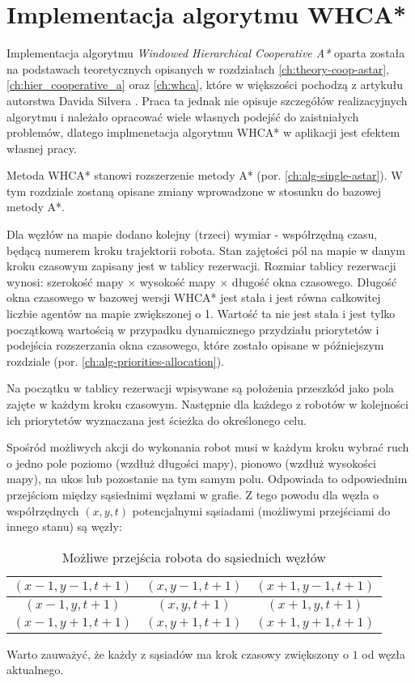 \section{Implementacja algorytmu WHCA*}
\label{ch:alg-whca}

Implementacja algorytmu {\it  Windowed Hierarchical Cooperative A*} oparta została na podstawach teoretycznych opisanych w rozdziałach \ref{ch:theory-coop-astar}, \ref{ch:hier_cooperative_a} oraz \ref{ch:whca}, które w większości pochodzą z artykułu autorstwa Davida Silvera \cite{cooppath}.
Praca ta jednak nie opisuje szczegółów realizacyjnych algorytmu i należało opracować wiele własnych podejść do zaistniałych problemów, dlatego implmenetacja algorytmu WHCA* w aplikacji jest efektem własnej pracy.

Metoda WHCA* stanowi rozszerzenie metody A* (por. \ref{ch:alg-single-astar}). W tym rozdziale zostaną opisane zmiany wprowadzone w stosunku do bazowej metody A*.

Dla węzłów na mapie dodano kolejny (trzeci) wymiar - współrzędną czasu, będącą numerem kroku trajektorii robota.
Stan zajętości pól na mapie w danym kroku czasowym zapisany jest w tablicy rezerwacji.
Rozmiar tablicy rezerwacji wynosi: szerokość mapy $\times$ wysokość mapy $\times$ długość okna czasowego.
Długość okna czasowego w bazowej wersji WHCA* jest stała i jest równa całkowitej liczbie agentów na mapie zwiększonej o 1. Wartość ta nie jest stała i jest tylko początkową wartością w przypadku dynamicznego przydziału priorytetów i podejścia rozszerzania okna czasowego, które zostało opisane w późniejszym rozdziale (por. \ref{ch:alg-priorities-allocation}).

Na początku w tablicy rezerwacji wpisywane są położenia przeszkód jako pola zajęte w każdym kroku czasowym.
Następnie dla każdego z robotów w kolejności ich priorytetów wyznaczana jest ścieżka do określonego celu.

Spośród możliwych akcji do wykonania robot musi w każdym kroku wybrać ruch o jedno pole poziomo (wzdłuż długości mapy), pionowo (wzdłuż wysokości mapy), na ukos lub pozostanie na tym samym polu.
Odpowiada to odpowiednim przejściom między sąsiednimi węzłami w grafie.
Z tego powodu dla węzła o współrzędnych $(x, y, t)$ potencjalnymi sąsiadami (możliwymi przejściami do innego stanu) są węzły:

\begin{table}
\caption{Możliwe przejścia robota do sąsiednich węzłów} \label{tab:node-neighbours} 
\centering
\begin{tabular}{| c | c | c |}
\hline
$(x-1, y-1, t+1)$ & $(x, y-1, t+1)$ & $(x+1, y-1, t+1)$ \\ \hline
$(x-1, y, t+1)$   & $(x, y, t+1)$   & $(x+1, y, t+1)$   \\ \hline
$(x-1, y+1, t+1)$ & $(x, y+1, t+1)$ & $(x+1, y+1, t+1)$ \\ \hline
\end{tabular}
\end{table}
Warto zauważyć, że każdy z sąsiadów ma krok czasowy zwiększony o $1$ od węzła aktualnego.

